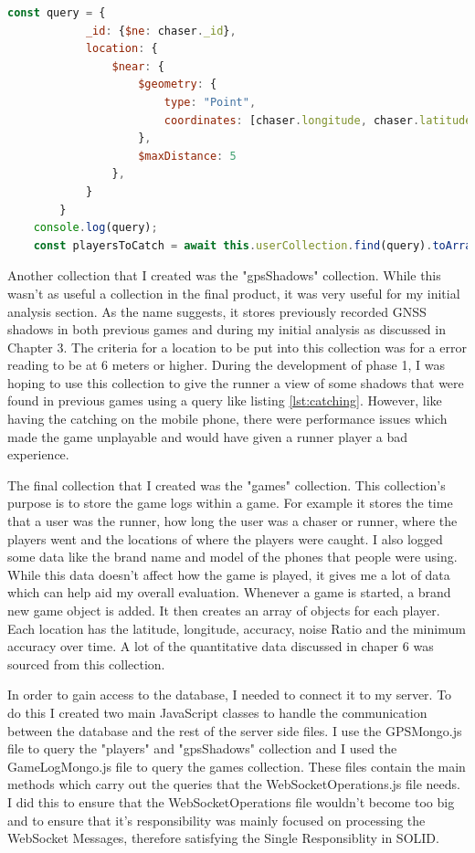 \documentclass{l4proj}
\begin{document}
\begin{lstlisting}[language=javascript, float, caption={The Geospatial query used to implement the catching mechanic. The \$ne key is the way to make a not equals query.}, label=lst:catching]
    const query = {
            _id: {$ne: chaser._id},
            location: {
                $near: {
                    $geometry: {
                        type: "Point",
                        coordinates: [chaser.longitude, chaser.latitude]
                    },
                    $maxDistance: 5
                },
            }
        }
    console.log(query);
    const playersToCatch = await this.userCollection.find(query).toArray();
\end{lstlisting}

Another collection that I created was the "gpsShadows" collection. While this wasn't as useful a collection in the final product, 
it was very useful for my initial analysis section. As the name suggests, it stores previously recorded GNSS shadows in both previous
games and during my initial analysis as discussed in Chapter 3. The criteria for a location to be put into this collection was for
a error reading to be at 6 meters or higher. During the development of phase 1, I was hoping to use this collection to give the runner
a view of some shadows that were found in previous games using a query like listing \ref{lst:catching}. However, like having the catching
on the mobile phone, there were performance issues which made the game unplayable and would have given a runner player a bad experience.

The final collection that I created was the "games" collection. This collection's purpose is to store the game logs within a game. For example
it stores the time that a user was the runner, how long the user was a chaser or runner, where the players went and the locations of where the
players were caught. I also logged some data like the brand name and model of the phones that people were using. While this data doesn't affect
how the game is played, it gives me a lot of data which can help aid my overall evaluation. Whenever a game is started, a brand new game object
is added. It then creates an array of objects for each player. Each location has the latitude, longitude, accuracy, noise Ratio and the minimum
accuracy over time. A lot of the quantitative data discussed in chaper 6 was sourced from this collection.

In order to gain access to the database, I needed to connect it to my server. To do this I created two main JavaScript classes to handle the
communication between the database and the rest of the server side files. I use the GPSMongo.js file to query the "players" and "gpsShadows"
collection and I used the GameLogMongo.js file to query the games collection. These files contain the main methods which carry out the queries
that the WebSocketOperations.js file needs. I did this to ensure that the WebSocketOperations file wouldn't become too big and to ensure that
it's responsibility was mainly focused on processing the WebSocket Messages, therefore satisfying the Single Responsiblity in SOLID.
\end{document}
